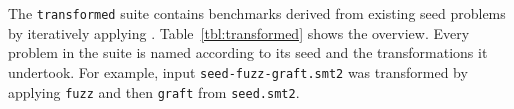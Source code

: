 



 The \texttt{transformed}
suite contains benchmarks derived from existing seed problems by
iteratively applying \transformer{}. Table~\ref{tbl:transformed} shows
the overview. Every problem in the suite is named according to its
seed and the transformations it undertook. For example, input
\texttt{seed-fuzz-graft.smt2} was transformed by applying
\texttt{fuzz} and then \texttt{graft} from \texttt{seed.smt2}.

